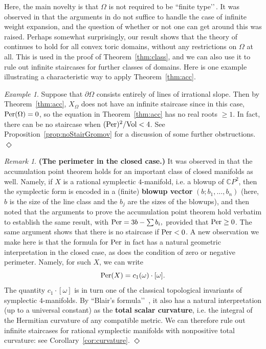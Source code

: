 \documentclass[11pt, reqno]{amsart}
\theoremstyle{remark}
\numberwithin{equation}{subsection}
\numberwithin{figure}{section}
\theoremstyle{customremark}
\newtheorem{rmk_no_diamond}[thm]{Remark}
\newenvironment{rmk}{\begin{rmk_no_diamond} } {\hfill$\er$ \end{rmk_no_diamond}}
\newtheorem{example_no_diamond}[thm]{Example}
\newenvironment{example}{\begin{example_no_diamond} } {\hfill$\er$ \end{example_no_diamond}}
\newcommand{\Vol}{{\rm Vol}}
\newcommand{\Per}{{\rm Per}}
\newcommand{\Om}{{\Omega}}
\newcommand{\p}{{\partial}}
\newcommand{\er}{{\Diamond}}
\begin{document}
Here, the main novelty is that $\Om$ is not required to be ``finite type\rq\rq\,.  It was observed in \cite[Rem. 4.11]{AADT} that the arguments in \cite{AADT} do not suffice to handle the case of infinite weight expansion, and the question of whether or not one can get around this was raised.  Perhaps somewhat surprisingly, our result shows that the theory of \cite{AADT} continues to hold for all convex toric domains, without any restrictions on $\Om$ at all.   This is used in the proof of Theorem~\ref{thm:class}, and we can also use it to rule out infinite staircases for further classes of domains.  Here is one example illustrating a characteristic way to apply Theorem~\ref{thm:acc}.

\begin{example}
Suppose that $\p\Omega$ consists entirely of lines of irrational slope.  Then by Theorem~\ref{thm:acc}, $X_{\Omega}$ does not have an infinite staircase since in this case, $\Per(\Omega) = 0$, so the equation in Theorem~\ref{thm:acc} 
has no  real roots $\ge 1$.  
In fact,  there can be no staircase when $(\Per)^2/\Vol < 4$. See Proposition~\ref{prop:noStairGromov} for a discussion of some further obstructions.
\end{example}


\begin{rmk}\label{rmk:curvature} {\bf (The  perimeter in the closed case.)}\; 
It was observed in \cite{AADT} that the accumulation point theorem holds for an important class of closed manifolds as well.  Namely, if $X$ is a rational symplectic $4$-manifold, i.e. a blowup of $\mathbb{C}P^2$, then the symplectic form is encoded in a (finite)  {\bf blowup vector} $(b; b_1, \ldots, b_n)$ (here, $b$ is the size of the line class and the $b_j$ are the sizes of the blowups), and then \cite{AADT} noted that the arguments to prove the accumulation point theorem hold verbatim to establish the same result, with $\Per = 3b - \sum b_i,$ provided that $\Per\ge 0$. The same argument shows that there is no staircase if $\Per < 0$.
A new observation we make here is that the formula for $\Per$ in fact has a natural geometric interpretation in the closed case, as does the condition of zero or negative perimeter.  Namely, for such $X$, we can write
\[ \Per(X) = c_1(\omega) \cdot [\omega].\]
The quantity $c_1 \cdot [\omega]$ is in turn one of the classical topological invariants of symplectic $4$-manifolds.  By ``Blair's formula\rq\rq\, \cite{blair}, it also has a natural interpretation (up to a universal constant) as the {\bf total scalar curvature}, i.e. the integral of the Hermitian curvature of any compatible metric.  We can therefore rule out infinite staircases for rational symplectic manifolds with nonpositive total curvature: see Corollary~\ref{cor:curvature}.
\end{rmk}
\end{document}
